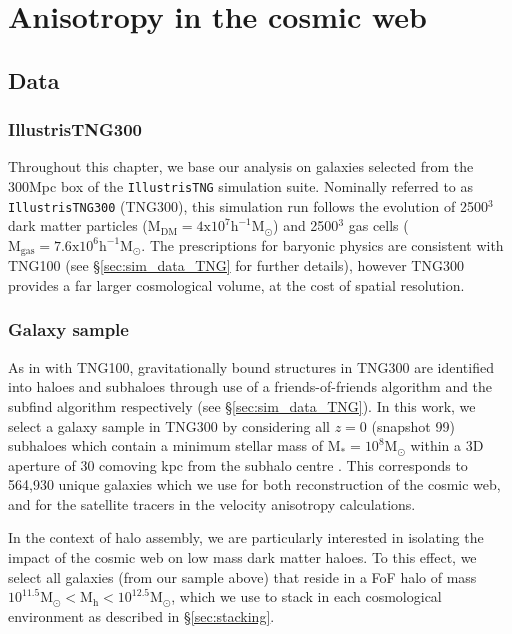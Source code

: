 \section{Anisotropy in the cosmic web} \label{sec:dyn_mod_aniso}
\subsection{Data}
\subsubsection{IllustrisTNG300}
Throughout this chapter, we base our analysis on galaxies selected from the 300Mpc box of the \texttt{IllustrisTNG} simulation suite. Nominally referred to as \texttt{IllustrisTNG300}  (TNG300), this simulation run follows the evolution of 2500$^3$ dark matter particles ($\mathrm{M_{DM} = 4 x 10^{7}h^{-1}M_{\odot}}$) and 2500$^3$ gas cells ($\mathrm{M_{gas} = 7.6 x 10^{6}h^{-1}M_{\odot}}$. The prescriptions for baryonic physics are consistent with TNG100 (see \S\ref{sec:sim_data_TNG} for further details), however TNG300 provides a far larger cosmological volume, at the cost of spatial resolution.

\subsubsection{Galaxy sample} \label{sec:gal_samp}
As in with TNG100, gravitationally bound structures in TNG300 are identified into haloes and subhaloes through use of a friends-of-friends algorithm \citep{davis85} and the subfind algorithm \citep{springel01} respectively (see \S\ref{sec:sim_data_TNG}). In this work, we select a galaxy sample in TNG300 by considering all $z=0$ (snapshot 99) subhaloes which contain a minimum stellar mass of $\mathrm{M_{\ast} = 10^{8} M_{\odot}}$ within a 3D aperture of 30 comoving kpc from the subhalo centre \citep[as defined in;][]{pillepich18b}. This corresponds to 564,930 unique galaxies which we use for both reconstruction of the cosmic web, and for the satellite tracers in the velocity anisotropy calculations.

In the context of halo assembly, we are particularly interested in isolating the impact of the cosmic web on low mass dark matter haloes. To this effect, we select all galaxies (from our sample above) that reside in a FoF halo of mass $\mathrm{10^{11.5} M_{\odot} < M_{h} < 10^{12.5} M_{\odot}}$, which we use to stack in each cosmological environment as described in \S\ref{sec:stacking}. 

